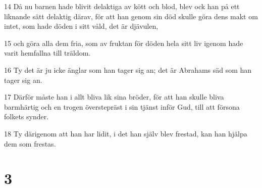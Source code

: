 \par 14 Då nu barnen hade blivit delaktiga av kött och blod, blev ock han på ett liknande sätt delaktig därav, för att han genom sin död skulle göra dens makt om intet, som hade döden i sitt våld, det är djävulen,
\par 15 och göra alla dem fria, som av fruktan för döden hela sitt liv igenom hade varit hemfallna till träldom.
\par 16 Ty det är ju icke änglar som han tager sig an; det är Abrahams säd som han tager sig an.
\par 17 Därför måste han i allt bliva lik sina bröder, för att han skulle bliva barmhärtig och en trogen överstepräst i sin tjänst inför Gud, till att försona folkets synder.
\par 18 Ty därigenom att han har lidit, i det han själv blev frestad, kan han hjälpa dem som frestas.

\chapter{3}

